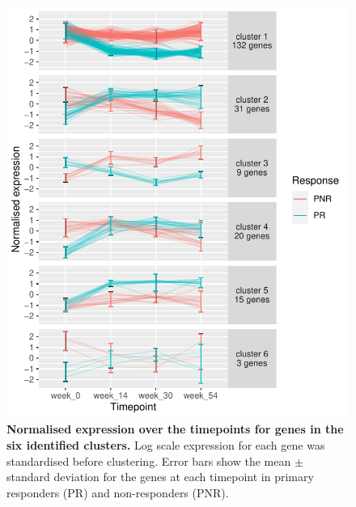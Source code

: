\begin{figure}
    \centering
    \includegraphics[width=1.0\textwidth,page=1]{mainmatter/figures/chapter_04/plot_gene_set_enrichment.spline_cluster_trajectories.pdf}
    \caption[
    ]{
        \textbf{Normalised expression over the timepoints for genes in the six identified clusters.}
        Log scale expression for each gene was standardised before clustering.
        Error bars show the mean $\pm$ standard deviation for the genes at each timepoint in primary responders (PR) and non-responders (PNR).
    }
    \label{fig:multipants_dge_spline_cluster_trajectories}
\end{figure}

